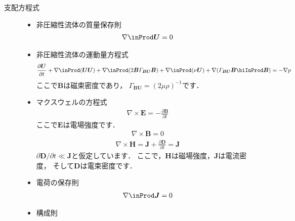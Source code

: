 \begin{description}
 \item[支配方程式] \mbox{}
            \begin{itemize}
             \item 非圧縮性流体の質量保存則
                   \begin{align}
                    \label{eq:3.19}
                    \nabla \inProd \bm{U} = 0
                   \end{align}
             \item 非圧縮性流体の運動量方程式
                   \begin{align}
                    \label{eq:3.20}
                    \frac{\partial\bm{U}}{\partial t}
                    + \nabla \inProd (\bm{U}\bm{U})
                    + \nabla \inProd (2\bm{B}\varGamma_{\bm{BU}}\bm{B})
                    + \nabla \inProd (\nu\bm{U})
                    + \nabla (\varGamma_{\bm{BU}}\bm{B} \biInProd \bm{B})
                    = -\nabla p
                   \end{align}
                   ここで$\bm{B}$は磁束密度であり，
                   $\varGamma_{\bm{BU}} = (2\mu\rho)^{-1}$です．
             \item マクスウェルの方程式
                   \begin{align}
                    \label{eq:3.21}
                    \nabla \times \bm{E} = -\frac{\partial\bm{B}}{\partial t}
                   \end{align}
                   ここで$\bm{E}$は電場強度です．
                   \begin{align}
                    \label{eq:3.22}
                    \nabla \times \bm{B} = 0
                   \end{align}
                   \begin{align}
                    \label{eq:3.23}
                    \nabla \times \bm{H}
                    = \bm{J} + \frac{\partial\bm{D}}{\partial t}
                    = \bm{J}
                   \end{align}
                   $\partial\bm{D}/\partial t \ll \bm{J}$と仮定しています．
                   ここで，$\bm{H}$は磁場強度，$\bm{J}$は電流密度，
                   そして$\bm{D}$は電束密度です．
             \item 電荷の保存則
                   \begin{align}
                    \label{eq:3.24}
                    \nabla \inProd \bm{J} = 0
                   \end{align}
             \item 構成則

\end{itemize}
\end{description}
